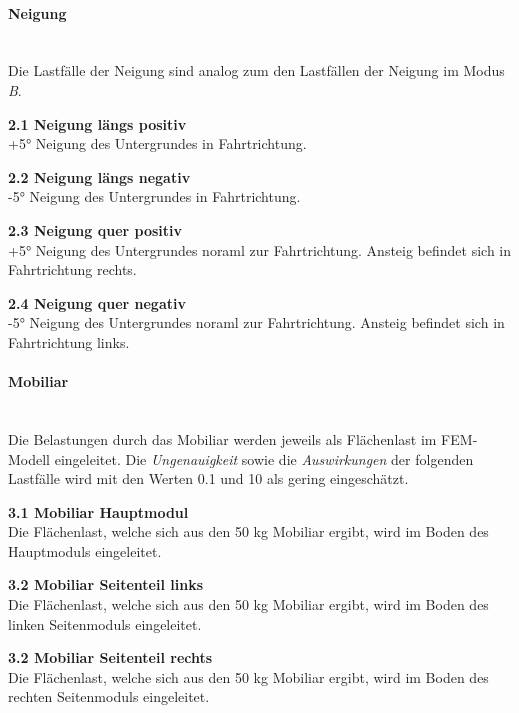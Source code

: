 \paragraph{Neigung}\mbox{}\\
Die Lastfälle der Neigung sind analog zum den Lastfällen der Neigung im Modus \emph{B}.
\begin{description}
  \item \textbf{2.1 Neigung längs positiv}\\
  +5° Neigung des Untergrundes in Fahrtrichtung.
  \item \textbf{2.2 Neigung längs negativ}\\
  -5° Neigung des Untergrundes in Fahrtrichtung.
  \item \textbf{2.3 Neigung quer positiv}\\
  +5° Neigung des Untergrundes noraml zur Fahrtrichtung. Ansteig befindet sich in Fahrtrichtung rechts.
  \item \textbf{2.4 Neigung quer negativ}\\
  -5° Neigung des Untergrundes noraml zur Fahrtrichtung. Ansteig befindet sich in Fahrtrichtung links.
\end{description}

\paragraph{Mobiliar}\mbox{}\\
Die Belastungen durch das Mobiliar werden jeweils als Flächenlast im FEM-Modell eingeleitet. Die \emph{Ungenauigkeit} sowie die \emph{Auswirkungen} der folgenden Lastfälle wird mit den Werten 0.1 und 10 als gering eingeschätzt.
\begin{description}
  \item \textbf{3.1 Mobiliar Hauptmodul}\\
  Die Flächenlast, welche sich aus den 50 kg Mobiliar ergibt, wird im Boden des Hauptmoduls eingeleitet.
  \item \textbf{3.2 Mobiliar Seitenteil links}\\
  Die Flächenlast, welche sich aus den 50 kg Mobiliar ergibt, wird im Boden des linken Seitenmoduls eingeleitet.
  \item \textbf{3.2 Mobiliar Seitenteil rechts}\\
  Die Flächenlast, welche sich aus den 50 kg Mobiliar ergibt, wird im Boden des rechten Seitenmoduls eingeleitet.
\end{description}

